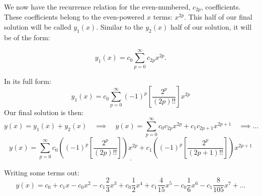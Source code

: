 \documentclass[a4paper,12pt]{article} %
\begin{document}
We now have the recurrence relation for the even-numbered, $c_{2p}$, coefficients. These coefficients belong to the even-powered $x$ terms: $x^{2p}$. This half of our final solution will be called $y_1(x)$. Similar to the $y_2(x)$ half of our solution, it will be of the form:

$$ y_1(x) = c_0 \sum_{p=0}^{\infty} c_{2p}x^{2p}. $$

In its full form:
$$ \boxed{y_1(x) = c_0 \sum_{p=0}^{\infty} (-1)^{p}\left[\frac{2^{p}}{(2p)!!}\right] x^{2p}} $$
Our final solution is then:
$$ y(x) = y_1(x) + y_2(x) \quad\implies\quad y(x) = \sum_{p=0}^{\infty} c_0c_{2p}x^{2p} + c_1c_{2p+1}x^{2p+1} \quad\implies\ldots $$
$$ \underline{\boxed{y(x) = \sum_{p=0}^{\infty} c_0\left( (-1)^{p}\left[\frac{2^{p}}{(2p)!!}\right]\right)x^{2p} + c_1\left((-1)^{p}\left[\frac{2^{p}}{(2p+1)!!}\right]\right)x^{2p+1}}}$$

Writing some terms out:
$$ y(x) = c_0 + c_1x -c_0x^2 - c_1\frac{2}{3}x^3 + c_0\frac{1}{2}x^4 + c_1\frac{4}{15}x^5-c_0\frac{1}{6}x^6-c_1\frac{8}{105}x^7+... $$
\end{document}
